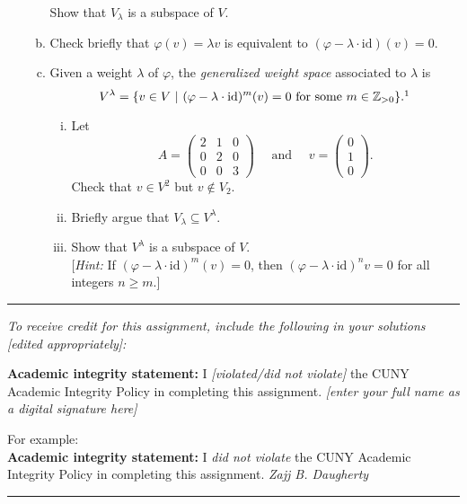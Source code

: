\documentclass[11pt, reqno]{amsart}
\theoremstyle{plain}
\theoremstyle{definition}
\theoremstyle{example}
\newcommand{\NOTE}[1]{{\color{blue}#1}}
\def\id{\mathrm{id}}
\def\f{\varphi}
\begin{document}
\begin{enumerate}[1.]
\begin{enumerate}[(a)]
\medskip

Show that $V_\lambda$ is a subspace of $V$. 


\item Check briefly that $\f(v) = \lambda v$ is equivalent to $(\f - \lambda\cdot \id)(v) = 0$. 
\item Given a weight $\lambda$ of $\f$, the \emph{generalized weight space} associated to $\lambda$ is 
$$V^\lambda = \{ v \in V ~|~ (\f - \lambda \cdot \id)^m(v) = 0 \text{ for some } m \in \ZZ_{>0}\}.\footnote{Here, $\psi^m$ means $\psi\circ \psi \circ \cdots \circ \psi$ ($m$ terms).}$$

\begin{enumerate}[(i)]
\item Let 
$$A = \begin{pmatrix} 2 & 1 & 0 \\ 0 & 2 & 0\\ 0&0 & 3\end{pmatrix} \quad \text{ and } \quad 
	v = \begin{pmatrix}0\\1\\0\end{pmatrix}.$$
	Check that $v \in V^2$ but $v \notin V_2$. 
\item Briefly argue that $V_\lambda \subseteq V^\lambda$.
\item Show that $V^\lambda$ is a subspace of $V$. \\
	{[\emph{Hint:} If $(\f - \lambda \cdot \id)^m (v) = 0$, then $(\f - \lambda \cdot \id)^n v = 0$ for all integers $n \ge m$.]}


\end{enumerate}



\end{enumerate}
\end{enumerate}

\vfill


\hrule
\emph{\small To receive credit for this assignment, include the following in your solutions [edited appropriately]:}

\smallskip

\textbf{Academic integrity statement:} I \emph{[violated/did not violate]} the CUNY Academic Integrity Policy in completing this assignment. \hfill \emph{[enter your full name as a digital signature here]}


\medskip

\NOTE{For example:\\
\textbf{Academic integrity statement:} I \emph{did not violate} the CUNY Academic Integrity Policy in completing this assignment. \hfill \emph{Zajj B. Daugherty}}
\medskip
\hrule

\vfill
\end{document}
